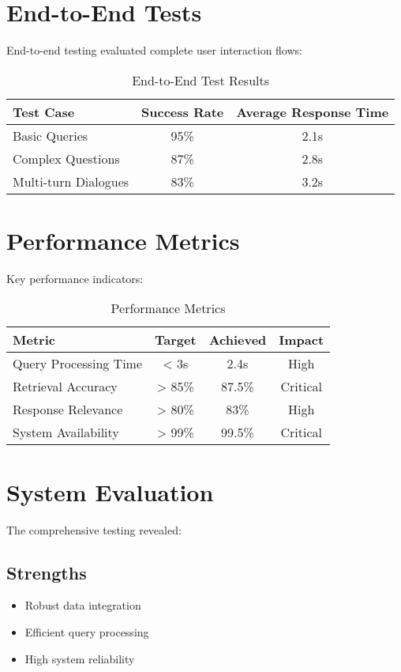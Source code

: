 \documentclass[12pt,a4paper]{report}
\begin{document}
\section{End-to-End Tests}
End-to-end testing evaluated complete user interaction flows:

\begin{table}[h]
    \centering
    \begin{tabular}{|l|c|c|}
        \hline
        \textbf{Test Case} & \textbf{Success Rate} & \textbf{Average Response Time} \\
        \hline
        Basic Queries & 95\% & 2.1s \\
        Complex Questions & 87\% & 2.8s \\
        Multi-turn Dialogues & 83\% & 3.2s \\
        \hline
    \end{tabular}
    \caption{End-to-End Test Results}
    \label{tab:e2e_tests}
\end{table}

\section{Performance Metrics}
Key performance indicators:

\begin{table}[h]
    \centering
    \begin{tabular}{|l|c|c|c|}
        \hline
        \textbf{Metric} & \textbf{Target} & \textbf{Achieved} & \textbf{Impact} \\
        \hline
        Query Processing Time & < 3s & 2.4s & High \\
        Retrieval Accuracy & > 85\% & 87.5\% & Critical \\
        Response Relevance & > 80\% & 83\% & High \\
        System Availability & > 99\% & 99.5\% & Critical \\
        \hline
    \end{tabular}
    \caption{Performance Metrics}
    \label{tab:performance_metrics}
\end{table}

\section{System Evaluation}
The comprehensive testing revealed:

\subsection{Strengths}
\begin{itemize}
    \item Robust data integration
    \item Efficient query processing
    \item High system reliability
\end{itemize}
\end{document}
